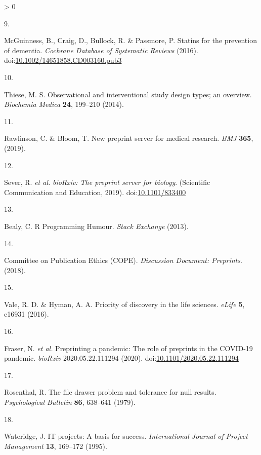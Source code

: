 \documentclass[a4paper, twoside]{templates/ociamthesis}
\newlength{\cslhangindent}
\newlength{\csllabelwidth}
\newenvironment{CSLReferences}[3] %
 {%
  \setlength{\parindent}{0pt}
  \ifodd #1 \everypar{\setlength{\hangindent}{\cslhangindent}}\ignorespaces\fi
  \ifnum #2 > 0
  \setlength{\parskip}{#2\baselineskip}
  \fi
 }%
 {}
\newcommand{\CSLLeftMargin}[1]{\parbox[t]{\maxof{\widthof{#1}}{\csllabelwidth}}{#1}}
\newcommand{\CSLRightInline}[1]{\parbox[t]{\linewidth - \csllabelwidth}{#1}}
\begin{document}
\begin{CSLReferences}{0}{0}
\leavevmode\hypertarget{ref-mcguinness2016b}{}%
\CSLLeftMargin{9. }
\CSLRightInline{McGuinness, B., Craig, D., Bullock, R. \& Passmore, P. Statins for the prevention of dementia. \emph{Cochrane Database of Systematic Reviews} (2016). doi:\href{https://doi.org/10.1002/14651858.CD003160.pub3}{10.1002/14651858.CD003160.pub3}}

\leavevmode\hypertarget{ref-thiese2014}{}%
\CSLLeftMargin{10. }
\CSLRightInline{Thiese, M. S. Observational and interventional study design types; an overview. \emph{Biochemia Medica} \textbf{24}, 199--210 (2014).}

\leavevmode\hypertarget{ref-rawlinson2019}{}%
\CSLLeftMargin{11. }
\CSLRightInline{Rawlinson, C. \& Bloom, T. New preprint server for medical research. \emph{BMJ} \textbf{365}, (2019).}

\leavevmode\hypertarget{ref-sever2019}{}%
\CSLLeftMargin{12. }
\CSLRightInline{Sever, R. \emph{et al.} \emph{{bioRxiv}: The preprint server for biology}. ({Scientific Communication and Education}, 2019). doi:\href{https://doi.org/10.1101/833400}{10.1101/833400}}

\leavevmode\hypertarget{ref-bealy2013}{}%
\CSLLeftMargin{13. }
\CSLRightInline{Bealy, C. R {Programming Humour}. \emph{Stack Exchange} (2013).}

\leavevmode\hypertarget{ref-committeeonpublicationethicscope2018}{}%
\CSLLeftMargin{14. }
\CSLRightInline{Committee on Publication Ethics (COPE). \emph{Discussion {Document}: {Preprints}}. (2018).}

\leavevmode\hypertarget{ref-vale2016}{}%
\CSLLeftMargin{15. }
\CSLRightInline{Vale, R. D. \& Hyman, A. A. Priority of discovery in the life sciences. \emph{eLife} \textbf{5}, e16931 (2016).}

\leavevmode\hypertarget{ref-fraser2020a}{}%
\CSLLeftMargin{16. }
\CSLRightInline{Fraser, N. \emph{et al.} Preprinting a pandemic: The role of preprints in the {COVID}-19 pandemic. \emph{bioRxiv} 2020.05.22.111294 (2020). doi:\href{https://doi.org/10.1101/2020.05.22.111294}{10.1101/2020.05.22.111294}}

\leavevmode\hypertarget{ref-rosenthal1979}{}%
\CSLLeftMargin{17. }
\CSLRightInline{Rosenthal, R. The file drawer problem and tolerance for null results. \emph{Psychological Bulletin} \textbf{86}, 638--641 (1979).}

\leavevmode\hypertarget{ref-wateridge1995}{}%
\CSLLeftMargin{18. }
\CSLRightInline{Wateridge, J. {IT} projects: A basis for success. \emph{International Journal of Project Management} \textbf{13}, 169--172 (1995).}


\end{CSLReferences}
\end{document}
